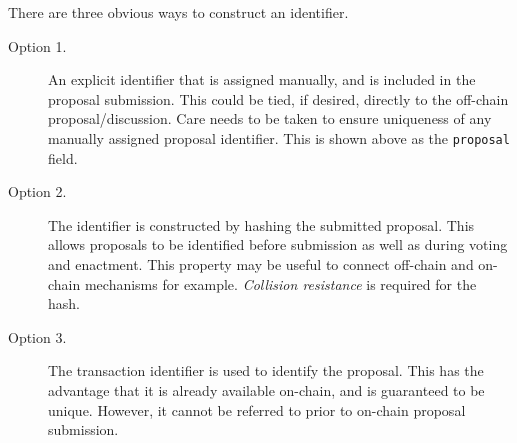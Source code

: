 There are three obvious ways to construct an identifier.

\begin{description}
\item
  [Option 1.]
  An explicit identifier that is assigned manually, and is included in the proposal submission.  This could be tied, if desired, directly to the off-chain proposal/discussion.
  Care needs to be taken to ensure uniqueness of any manually assigned proposal identifier.  This is shown above as the \texttt{proposal} field.
\item
  [Option 2.]
  The identifier is constructed by hashing the submitted proposal.  This allows proposals to be identified before submission as well as during voting and enactment.  This property may be
  useful to connect off-chain and on-chain mechanisms for example.  \emph{Collision resistance} is required for the hash. 
\item
  [Option 3.]
  The transaction identifier is used to identify the proposal.  This has the advantage that it is already available on-chain, and is guaranteed to be unique.  However, it cannot be
  referred to prior to on-chain proposal submission.
\end{description}
